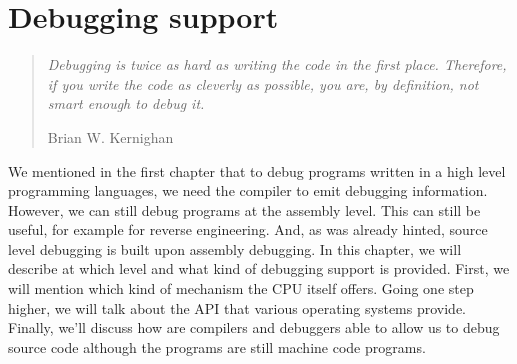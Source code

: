\chapter{Debugging support}

\begin{quote}
  \textit{Debugging is twice as hard as writing the code in the first place.
    Therefore, if you write the code as cleverly as possible, you are, by
    definition, not smart enough to debug it.}\begin{flushright}
    \tiny{Brian W. Kernighan}
  \end{flushright}
\end{quote}

We mentioned in the first chapter that to debug programs written in a high
level programming languages, we need the compiler to emit debugging
information. However, we can still debug programs at the assembly level. This
can still be useful, for example for reverse engineering. And, as was already
hinted, source level debugging is built upon assembly debugging. In this
chapter, we will describe at which level and what kind of debugging support is
provided. First, we will mention which kind of mechanism the CPU itself offers.
Going one step higher, we will talk about the API that various operating
systems provide. Finally, we'll discuss how are compilers and debuggers able to
allow us to debug source code although the programs are still machine code
programs. 

